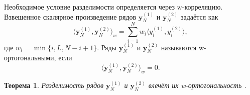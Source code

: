 \documentclass[a4paper, 11pt]{article}
\newtheorem{theorem}{Теорема} %
\begin{document}
Необходимое условие разделимости определяется через w-корреляцию. Взвешенное скалярное произведение рядов $\textbf{y}_N^{(1)}$ и $\textbf{y}_N^{(2)}$ задаётся как
\begin{equation}\label{winn}
	\langle \textbf{y}_N^{(1)},\textbf{y}_N^{(2)}\rangle_w=\sum_{i=1}^N w_i \langle y_i^{(1)},y_i^{(2)}\rangle,
\end{equation}
где $w_i=\min\{i,L,N-i+1\}$. Ряды $\textbf{y}_N^{(1)}$ и $\textbf{y}_N^{(2)}$ называются w-ортогональными, если
\begin{equation}
	\langle \textbf{y}_N^{(1)},\textbf{y}_N^{(2)}\rangle_w=0.
\end{equation}

\begin{theorem}\label{thm:fSep}
Разделимость рядов $\textbf{y}_N^{(1)}$ и $\textbf{y}_N^{(2)}$ влечёт их w-ортогональность \cite{haghbin2019functionalsingularspectrumanalysis}.
\end{theorem}


\end{document}
